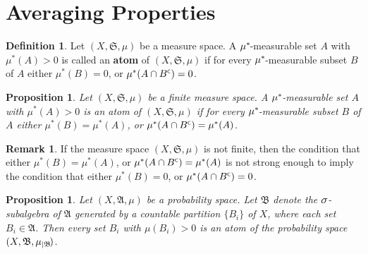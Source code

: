 \documentclass[
twoside=true,
paper=letter,
fontsize=9pt,
pagesize=auto,
leqno,
openany,
headsepline,
overfullrule,
]{scrbook}
\theoremstyle{plain}
\theoremstyle{plain}
\newtheorem{prop}[thm]{Proposition}
\theoremstyle{definition}
\newtheorem{defn}[thm]{Definition}
\newtheorem{rmk}[thm]{Remark}
\theoremstyle{bfnoteitalic}
\theoremstyle{bfnoteroman}
\newcommand{\term}[1]{\textbf{#1}\index{#1}}
\newcommand{\sigalg}[1]{\mathfrak{#1}}
\newcommand{\textsigma}{\hbox{\large{$\sigma$}}\kern-1pt}
\newcommand{\restrictedto}[1]{_{\lvert#1}\kern-1.5pt}
\newcommand{\comp}{^{\hbox{\tiny{$\mathsf C$}}}}
\newcommand{\meets}{\cap}
\newcommand{\semiring}{\sigalg{S}}
\newcommand{\sigmaalgebra}{\sigalg{A}}
\newcommand{\sigmaalgebraii}{\sigalg{B}}
\newcommand{\kernast}{\ast\kern-1pt}
\newcommand{\sigalgb}{\sigmaalgebraii}
\newcommand{\measurespace}{X}
\newcommand{\measure}{\mu}
\begin{document}
\section{Averaging Properties}
%




\begin{defn}
Let $(\measurespace, \semiring, \measure)$ be a measure space.  A $\measure^\kernast$-measurable set $A$ with $\measure^*(A)>0$ is called an \term{atom} of $(\measurespace, \semiring, \measure)$ if for every $\measure^\kernast$-measurable subset $B$ of $A$ either $\measure^*(B) = 0$, or $\measure^*(A\meets B\comp)=0$. 
\end{defn}



\begin{prop}\label{atom}
Let $(\measurespace, \semiring, \measure)$ be a finite measure space.  A
$\measure^\kernast$\hyp{}measurable set $A$ with $\measure^*(A)>0$ is an atom of $(\measurespace, \semiring, \measure)$ if for every $\measure^\kernast$-measurable subset $B$ of $A$ either $\measure^*(B) = \measure^*(A)$, or $\measure^*(A\meets B\comp)= \measure^*(A)$.
\end{prop}



\begin{rmk}
If the measure space $(\measurespace, \semiring, \measure)$ is not finite, then the condition that either $\measure^*(B) = \measure^*(A)$, or $\measure^*(A\meets B\comp)= \measure^*(A)$
is not strong enough to imply the condition that
either $\measure^*(B) = 0$, or $\measure^*(A\meets B\comp)=0$. 
\end{rmk}



\begin{prop}\label{countable_partition_of_atoms}
Let $(\measurespace, \sigmaalgebra,\measure)$ be a probability space.
Let $\sigalgb$ denote the $\textsigma$-subalgebra of $\sigmaalgebra$ generated by a countable partition $\{B_i\}$ of $\measurespace$, where each set $B_i\in\sigmaalgebra$. Then every set $B_i$ with 
$\measure(B_i) > 0$ is an atom of the probability space
$(\measurespace, \sigalgb,\measure\restrictedto{\sigalgb})$.
\end{prop}
\end{document}
